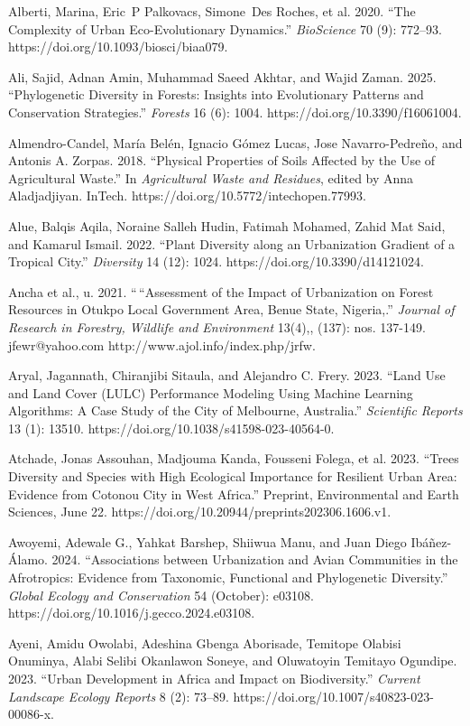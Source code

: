 Alberti, Marina, Eric~P Palkovacs, Simone~Des Roches, et al. 2020. ``The Complexity of Urban Eco-Evolutionary Dynamics.'' \emph{BioScience} 70 (9): 772--93. https://doi.org/10.1093/biosci/biaa079.

Ali, Sajid, Adnan Amin, Muhammad Saeed Akhtar, and Wajid Zaman. 2025. ``Phylogenetic Diversity in Forests: Insights into Evolutionary Patterns and Conservation Strategies.'' \emph{Forests} 16 (6): 1004. https://doi.org/10.3390/f16061004.

Almendro-Candel, María Belén, Ignacio Gómez Lucas, Jose Navarro-Pedreño, and Antonis A. Zorpas. 2018. ``Physical Properties of Soils Affected by the Use of Agricultural Waste.'' In \emph{Agricultural Waste and Residues}, edited by Anna Aladjadjiyan. InTech. https://doi.org/10.5772/intechopen.77993.

Alue, Balqis Aqila, Noraine Salleh Hudin, Fatimah Mohamed, Zahid Mat Said, and Kamarul Ismail. 2022. ``Plant Diversity along an Urbanization Gradient of a Tropical City.'' \emph{Diversity} 14 (12): 1024. https://doi.org/10.3390/d14121024.

Ancha et al., u. 2021. ``\,``Assessment of the Impact of Urbanization on Forest Resources in Otukpo Local Government Area, Benue State, Nigeria,.'' \emph{Journal of Research in Forestry, Wildlife and Environment} 13(4),, (137): nos. 137-149. jfewr@yahoo.com http://www.ajol.info/index.php/jrfw.

Aryal, Jagannath, Chiranjibi Sitaula, and Alejandro C. Frery. 2023. ``Land Use and Land Cover (LULC) Performance Modeling Using Machine Learning Algorithms: A Case Study of the City of Melbourne, Australia.'' \emph{Scientific Reports} 13 (1): 13510. https://doi.org/10.1038/s41598-023-40564-0.

Atchade, Jonas Assouhan, Madjouma Kanda, Fousseni Folega, et al. 2023. ``Trees Diversity and Species with High Ecological Importance for Resilient Urban Area: Evidence from Cotonou City in West Africa.'' Preprint, Environmental and Earth Sciences, June 22. https://doi.org/10.20944/preprints202306.1606.v1.

Awoyemi, Adewale G., Yahkat Barshep, Shiiwua Manu, and Juan Diego Ibáñez-Álamo. 2024. ``Associations between Urbanization and Avian Communities in the Afrotropics: Evidence from Taxonomic, Functional and Phylogenetic Diversity.'' \emph{Global Ecology and Conservation} 54 (October): e03108. https://doi.org/10.1016/j.gecco.2024.e03108.

Ayeni, Amidu Owolabi, Adeshina Gbenga Aborisade, Temitope Olabisi Onuminya, Alabi Selibi Okanlawon Soneye, and Oluwatoyin Temitayo Ogundipe. 2023. ``Urban Development in Africa and Impact on Biodiversity.'' \emph{Current Landscape Ecology Reports} 8 (2): 73--89. https://doi.org/10.1007/s40823-023-00086-x.

